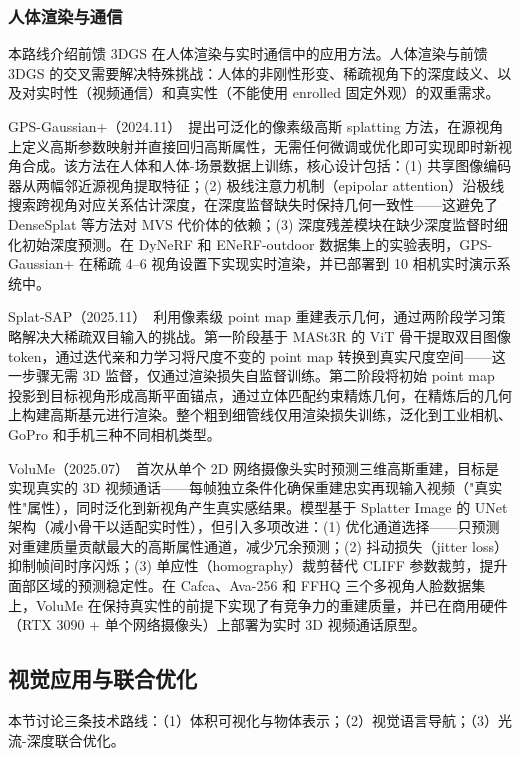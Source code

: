 \subsubsection{人体渲染与通信}

本路线介绍前馈 3DGS 在人体渲染与实时通信中的应用方法。人体渲染与前馈 3DGS 的交叉需要解决特殊挑战：人体的非刚性形变、稀疏视角下的深度歧义、以及对实时性（视频通信）和真实性（不能使用 enrolled 固定外观）的双重需求。

GPS-Gaussian+（2024.11）~\cite{2411_11363}提出可泛化的像素级高斯 splatting 方法，在源视角上定义高斯参数映射并直接回归高斯属性，无需任何微调或优化即可实现即时新视角合成。该方法在人体和人体-场景数据上训练，核心设计包括：(1) 共享图像编码器从两幅邻近源视角提取特征；(2) 极线注意力机制（epipolar attention）沿极线搜索跨视角对应关系估计深度，在深度监督缺失时保持几何一致性——这避免了 DenseSplat 等方法对 MVS 代价体的依赖；(3) 深度残差模块在缺少深度监督时细化初始深度预测。在 DyNeRF 和 ENeRF-outdoor 数据集上的实验表明，GPS-Gaussian+ 在稀疏 4--6 视角设置下实现实时渲染，并已部署到 10 相机实时演示系统中。

Splat-SAP（2025.11）~\cite{2511_22704}利用像素级 point map 重建表示几何，通过两阶段学习策略解决大稀疏双目输入的挑战。第一阶段基于 MASt3R 的 ViT 骨干提取双目图像 token，通过迭代亲和力学习将尺度不变的 point map 转换到真实尺度空间——这一步骤无需 3D 监督，仅通过渲染损失自监督训练。第二阶段将初始 point map 投影到目标视角形成高斯平面锚点，通过立体匹配约束精炼几何，在精炼后的几何上构建高斯基元进行渲染。整个粗到细管线仅用渲染损失训练，泛化到工业相机、GoPro 和手机三种不同相机类型。

VoluMe（2025.07）~\cite{2507_21311}首次从单个 2D 网络摄像头实时预测三维高斯重建，目标是实现真实的 3D 视频通话——每帧独立条件化确保重建忠实再现输入视频（"真实性"属性），同时泛化到新视角产生真实感结果。模型基于 Splatter Image 的 UNet 架构（减小骨干以适配实时性），但引入多项改进：(1) 优化通道选择——只预测对重建质量贡献最大的高斯属性通道，减少冗余预测；(2) 抖动损失（jitter loss）抑制帧间时序闪烁；(3) 单应性（homography）裁剪替代 CLIFF 参数裁剪，提升面部区域的预测稳定性。在 Cafca、Ava-256 和 FFHQ 三个多视角人脸数据集上，VoluMe 在保持真实性的前提下实现了有竞争力的重建质量，并已在商用硬件（RTX 3090 + 单个网络摄像头）上部署为实时 3D 视频通话原型。

\subsection{视觉应用与联合优化}
\label{ss:13_5b}

本节讨论三条技术路线：（1）体积可视化与物体表示；（2）视觉语言导航；（3）光流-深度联合优化。

